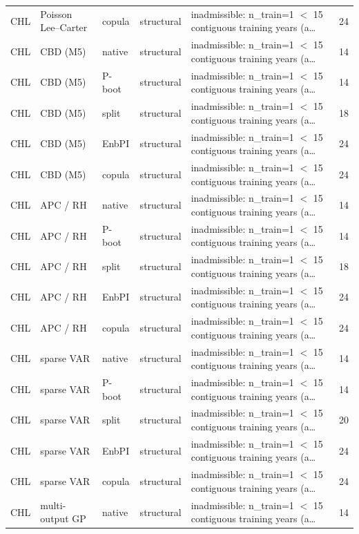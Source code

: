 {\begin{longtable}{@{}lllp{1.6cm}p{6.2cm}r@{}}
CHL & Poisson Lee--Carter & copula & structural & inadmissible: n\_train=1 $<$ 15 contiguous training years (a\ldots & 24 \\
CHL & CBD (M5) & native & structural & inadmissible: n\_train=1 $<$ 15 contiguous training years (a\ldots & 14 \\
CHL & CBD (M5) & P-boot & structural & inadmissible: n\_train=1 $<$ 15 contiguous training years (a\ldots & 14 \\
CHL & CBD (M5) & split & structural & inadmissible: n\_train=1 $<$ 15 contiguous training years (a\ldots & 18 \\
CHL & CBD (M5) & EnbPI & structural & inadmissible: n\_train=1 $<$ 15 contiguous training years (a\ldots & 24 \\
CHL & CBD (M5) & copula & structural & inadmissible: n\_train=1 $<$ 15 contiguous training years (a\ldots & 24 \\
CHL & APC / RH & native & structural & inadmissible: n\_train=1 $<$ 15 contiguous training years (a\ldots & 14 \\
CHL & APC / RH & P-boot & structural & inadmissible: n\_train=1 $<$ 15 contiguous training years (a\ldots & 14 \\
CHL & APC / RH & split & structural & inadmissible: n\_train=1 $<$ 15 contiguous training years (a\ldots & 18 \\
CHL & APC / RH & EnbPI & structural & inadmissible: n\_train=1 $<$ 15 contiguous training years (a\ldots & 24 \\
CHL & APC / RH & copula & structural & inadmissible: n\_train=1 $<$ 15 contiguous training years (a\ldots & 24 \\
CHL & sparse VAR & native & structural & inadmissible: n\_train=1 $<$ 15 contiguous training years (a\ldots & 14 \\
CHL & sparse VAR & P-boot & structural & inadmissible: n\_train=1 $<$ 15 contiguous training years (a\ldots & 14 \\
CHL & sparse VAR & split & structural & inadmissible: n\_train=1 $<$ 15 contiguous training years (a\ldots & 20 \\
CHL & sparse VAR & EnbPI & structural & inadmissible: n\_train=1 $<$ 15 contiguous training years (a\ldots & 24 \\
CHL & sparse VAR & copula & structural & inadmissible: n\_train=1 $<$ 15 contiguous training years (a\ldots & 24 \\
CHL & multi-output GP & native & structural & inadmissible: n\_train=1 $<$ 15 contiguous training years (a\ldots & 14 \\

\end{longtable}}
